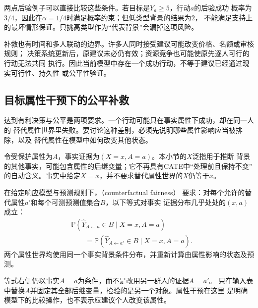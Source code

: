 两点后验例子可以直接比较这些条件。若目标是\(Y_a\geq5\)，行动\(a\)的后验成功
概率为\(3/4\)，因此在\(\alpha=1/4\)时满足概率约束；但低类型背景的结果为\(2\)，
不能满足支持上的最坏情形保证。只挑高类型作为“代表背景”会漏掉这项风险。

补救也有时间和多人联动的边界。许多人同时接受建议可能改变价格、名额或审核规则；
决策系统更新后，原建议未必仍有效；资源竞争也可能使原先逐人可行的行动无法共同
执行。因此当前模型中存在一个成功行动，不等于建议已经通过现实可行性、持久性
或公平性验证。

\subsection{目标属性干预下的公平补救}
\label{sec:causal-fair-recourse}

达到有利决策与公平是两项要求。一个行动可能只在事实属性下成功，却在同一人的
替代属性世界里失败。要讨论这种差别，必须先说明哪些属性影响应当被排除，以及
替代属性在模型中如何改变其他状态。

令受保护属性为\(A\)，事实证据为\((X=x,A=a)\)。本小节的\(X\)泛指用于推断
背景的其他事实，可能包含属性的后继变量；它不再具有CATE中“处理前且保持不变”
的自动含义。事实中给定\(X=x\)，并不要求替代属性世界的\(X\)仍等于\(x\)。
\begin{definition}[反事实公平]
  \label{def:causal-counterfactual-fairness}
  在给定响应模型与预测规则下，（counterfactual fairness）
  要求：对每个允许的替代属性\(a'\)和每个可测预测值集合\(B\)，以下等式对事实
  证据分布几乎处处的\((x,a)\)成立：
  \begin{equation}
    \begin{aligned}
      &\mathbb P(\widehat Y_{A\leftarrow a}\in B\mid X=x,A=a)\\
      &\qquad=
      \mathbb P(\widehat Y_{A\leftarrow a'}\in B\mid X=x,A=a).
    \end{aligned}
    \label{eq:causal-counterfactual-fairness}
  \end{equation}
  两个属性世界均使用同一个事实背景条件分布，并重新计算由属性影响的状态及预测。
\end{definition}

等式右侧仍以事实\(A=a\)为条件，而不是改用另一群人的证据\(A=a'\)。
只在输入表中替换\(A\)并固定其全部后继变量，检验的是另一个对象。属性干预在这里
是明确模型下的比较操作，也不表示应建议个人改变该属性。

